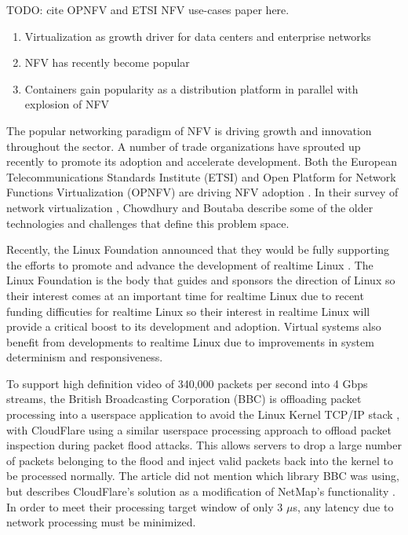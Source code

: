 TODO: cite OPNFV and ETSI NFV use-cases paper here.
\begin{enumerate}
  \item Virtualization as growth driver for data centers and enterprise networks
  \item NFV has recently become popular 
  \item Containers gain popularity as a distribution platform in parallel with explosion of NFV
\end{enumerate}

The popular networking paradigm of NFV is driving growth and innovation throughout the sector.
A number of trade organizations have sprouted up recently to promote its adoption and accelerate development.
Both the European Telecommunications Standards Institute (ETSI) and Open Platform for Network Functions Virtualization (OPNFV) \autocite{opnfv1} are driving NFV adoption \autocite{cohnopnfv}.
In their survey of network virtualization \autocite{_chowdhury_1}, Chowdhury and Boutaba describe some of the older technologies and challenges that define this problem space.


Recently, the Linux Foundation announced that they would be fully supporting the efforts to promote and advance the development of realtime Linux \autocite{_linux_foundation_1}.
The Linux Foundation is the body that guides and sponsors the direction of Linux so their interest comes at an important time for realtime Linux due to recent funding difficuties for realtime Linux \autocite{_lwn_1} so their interest in realtime Linux will provide a critical boost to its development and adoption.
Virtual systems also benefit from developments to realtime Linux due to improvements in system determinism and responsiveness.

To support high definition video of 340,000 packets per second into 4 Gbps streams, the British Broadcasting Corporation (BBC) is offloading packet processing into a userspace application to avoid the Linux Kernel TCP/IP stack \autocite{bbcbypass}, with CloudFlare using a similar userspace processing approach to offload packet inspection during packet flood attacks.
This allows servers to drop a large number of packets belonging to the flood and inject valid packets back into the kernel to be processed normally.  
The article did not mention which library BBC was using, but describes CloudFlare's solution as a modification of NetMap's functionality \autocite{netmapbertin}.
In order to meet their processing target window of only 3 $\mu$s, any latency due to network processing must be minimized.

